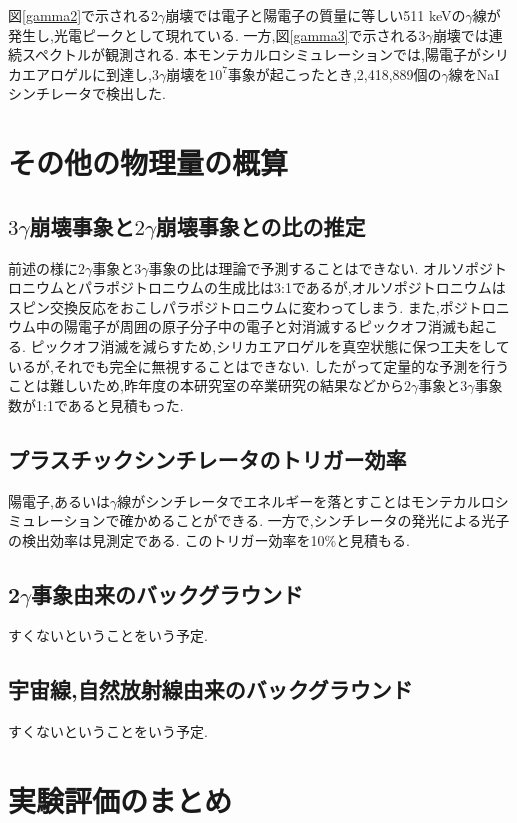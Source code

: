 図\ref{gamma2}で示される2$\gamma$崩壊では電子と陽電子の質量に等しい511 keVの$\gamma$線が発生し,光電ピークとして現れている.
一方,図\ref{gamma3}で示される$3\gamma$崩壊では連続スペクトルが観測される.
本モンテカルロシミュレーションでは,陽電子がシリカエアロゲルに到達し,$3\gamma$崩壊を$10^7$事象が起こったとき,2,418,889個の$\gamma$線をNaIシンチレータで検出した.


\section{その他の物理量の概算}
\label{section_other}

\subsection{$3\gamma$崩壊事象と$2\gamma$崩壊事象との比の推定}
前述の様に$2\gamma$事象と$3\gamma$事象の比は理論で予測することはできない.
オルソポジトロニウムとパラポジトロニウムの生成比は3:1であるが,オルソポジトロニウムはスピン交換反応をおこしパラポジトロニウムに変わってしまう.
また,ポジトロニウム中の陽電子が周囲の原子分子中の電子と対消滅するピックオフ消滅も起こる.
ピックオフ消滅を減らすため,シリカエアロゲルを真空状態に保つ工夫をしているが,それでも完全に無視することはできない.
したがって定量的な予測を行うことは難しいため,昨年度の本研究室の卒業研究の結果などから$2\gamma$事象と$3\gamma$事象数が1:1であると見積もった.

\subsection{プラスチックシンチレータのトリガー効率}
陽電子,あるいは$\gamma$線がシンチレータでエネルギーを落とすことはモンテカルロシミュレーションで確かめることができる.
一方で,シンチレータの発光による光子の検出効率は見測定である.
このトリガー効率を10\%と見積もる.

\subsection{2$\gamma$事象由来のバックグラウンド}
すくないということをいう予定.

\subsection{宇宙線,自然放射線由来のバックグラウンド}
すくないということをいう予定.\cite{小早川201207}

\section{実験評価のまとめ}
\label{section_testall}

